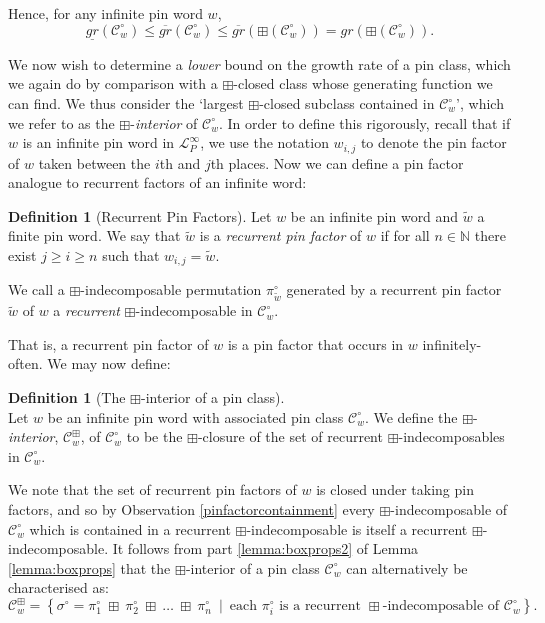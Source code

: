 \documentclass[11pt,a4paper]{article}
\theoremstyle{definition}
\newtheorem{defn}[thm]{Definition}
\begin{document}
Hence, for any infinite pin word $w$,
\[
\underline{gr}(\mathcal{C}^{\circ}_{w}) \leq \overline{gr}(\mathcal{C}^{\circ}_{w}) \leq \overline{gr}(\boxplus(\mathcal{C}^{\circ}_{w})) = gr(\boxplus(\mathcal{C}^{\circ}_{w})).
\]

We now wish to determine a \emph{lower} bound on the growth rate of a pin class, which we again do by comparison with a $\boxplus$-closed class whose generating function we can find. We thus consider the `largest $\boxplus$-closed subclass contained in $\mathcal{C}^{\circ}_{w}$', which we refer to as the $\boxplus$-\emph{interior} of $\mathcal{C}^{\circ}_{w}$. In order to define this rigorously, recall that if $w$ is an infinite pin word in $\mathcal{L}^{\infty}_{P}$, we use the notation $w_{i,j}$ to denote the pin factor of $w$ taken between the $i$th and $j$th places. Now we can define a pin factor analogue to recurrent factors of an infinite word:

\begin{defn}[Recurrent Pin Factors]
Let $w$ be an infinite pin word and $\widetilde{w}$ a finite pin word. We say that $\widetilde{w}$ is a \emph{recurrent pin factor} of $w$ if for all $n \in \mathbb{N}$ there exist $j \geq i \geq n$ such that $w_{i,j} = \widetilde{w}$.

We call a $\boxplus$-indecomposable permutation $\pi^{\circ}_{\widetilde{w}}$ generated by a recurrent pin factor $\widetilde{w}$ of $w$ a \emph{recurrent} $\boxplus$-indecomposable in $\mathcal{C}^{\circ}_{w}$.
\end{defn}

That is, a recurrent pin factor of $w$ is a pin factor that occurs in $w$ infinitely-often. We may now define:

\begin{defn}[The $\boxplus$-interior of a pin class] \label{def:boxinteriorofpinclass} \ \\
Let $w$ be an infinite pin word with associated pin class $\mathcal{C}^{\circ}_{w}$. We define the $\boxplus$-\emph{interior}, $\mathcal{C}^{\boxplus}_{w}$, of $\mathcal{C}^{\circ}_{w}$ to be the $\boxplus$-closure of the set of recurrent $\boxplus$-indecomposables in $\mathcal{C}^{\circ}_{w}$.
\end{defn}

We note that the set of recurrent pin factors of $w$ is closed under taking pin factors, and so by Observation \ref{pinfactorcontainment} every $\boxplus$-indecomposable of $\mathcal{C}^{\circ}_{w}$ which is contained in a recurrent $\boxplus$-indecomposable is itself a recurrent $\boxplus$-indecomposable. It follows from part \ref{lemma:boxprops2} of Lemma \ref{lemma:boxprops} that the $\boxplus$-interior of a pin class $\mathcal{C}^{\circ}_{w}$ can alternatively be characterised as:
\[
\mathcal{C}^{\boxplus}_{w} = \left\{\sigma^{\circ} = \pi^{\circ}_{1} \ \boxplus \ \pi^{\circ}_{2} \ \boxplus \ \dots \ \boxplus \ \pi^{\circ}_{n} \ \mid \ \text{each $\pi^{\circ}_{i}$ is a recurrent $\boxplus$-indecomposable of $\mathcal{C}^{\circ}_{w}$}\right\}.
\]
\end{document}
